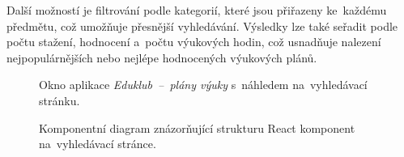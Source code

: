 \documentclass[male,czech,api_bc]{kitheses}
\begin{document}
Další možností je filtrování podle kategorií, které jsou přiřazeny ke~každému předmětu, což umožňuje přesnější vyhledávání. Výsledky lze také seřadit podle počtu stažení, hodnocení a~počtu výukových hodin, což usnadňuje nalezení nejpopulárnějších nebo nejlépe hodnocených výukových plánů.

\begin{figure}[H]
	\centering
	\caption{Okno aplikace \textit{Eduklub~--~plány výuky} s~náhledem na~vyhledávací stránku.}
	\label{fig:eduklub-3}
\end{figure}

\begin{figure}[H]
	\centering
	\caption{Komponentní diagram znázorňující strukturu React komponent na~vyhledávací stránce.}
	\label{fig:component-diagram-react-3}
\end{figure}
\end{document}
